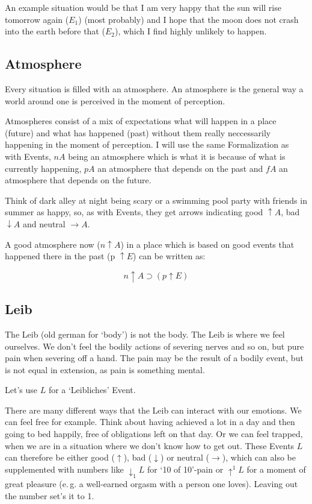 \documentclass{scrartcl}
\begin{document}
An example situation would be that I am very happy that the sun will rise tomorrow again ($E_1$) (most probably) and I hope that the moon
does not crash into the earth before that ($E_2$), which I find highly unlikely to happen.

\subsection{Atmosphere}

Every situation is filled with an atmosphere. An atmosphere is the general way a world around one is perceived in the moment of perception.

Atmospheres consist of a mix of expectations what will happen in a place (future) and what has happened (past) without them
really neccessarily happening in the moment of perception. I will use the same Formalization as with Events,
$n A$ being an atmosphere which is what it is because of what is currently happening, $p A$ an atmosphere that
depends on the past and $f A$ an atmosphere that depends on the future.

Think of dark alley at night being scary or a swimming pool party with friends
in summer as happy, so, as with Events, they get arrows indicating good $\uparrow A$, bad $\downarrow A$ and neutral $\rightarrow A$.

A good atmosphere now ($n\uparrow A$) in a place which is based on good events that happened there in the past (p $\uparrow E$)  can be written as:

\begin{equation}n\uparrow A \supset \left(
			p \uparrow E
	\right)
\end{equation}

\subsection{Leib}

The Leib (old german for `body') is not the body. The Leib is where we feel ourselves. We don't feel the bodily actions of severing
nerves and so on, but pure pain when severing off a hand. The pain may be the result of a bodily event, but is not equal in extension,
as pain is something mental. 

Let's use $L$ for a `Leibliches' Event. 

There are many different ways that the Leib can interact with our emotions. We can feel free for example. Think about having achieved
a lot in a day and then going to bed happily, free of obligations left on that day. Or we can feel trapped, when we are in a situation
where we don't know how to get out. These Events $L$ can therefore be either good ($\uparrow$), bad ($\downarrow$) or neutral ($\rightarrow$),
which can also be supplemented with numbers like $\downarrow_1 L$ for `10 of 10'-pain or $\uparrow^1 L$ for a moment of great pleasure
(e.\,g. a well-earned orgasm with a person one loves). Leaving out the number set's it to 1.
\end{document}
